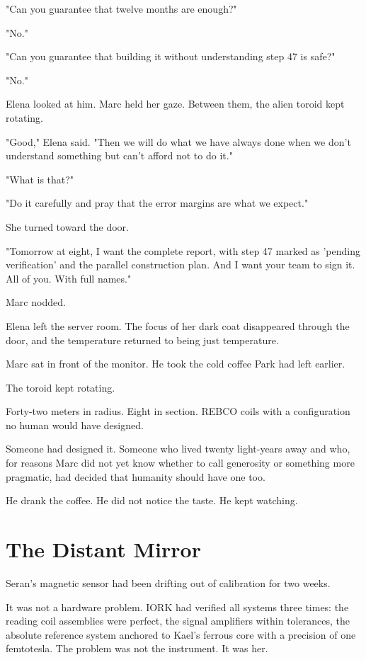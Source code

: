 \documentclass[11pt,a5paper,twoside]{book}
\begin{document}
"Can you guarantee that twelve months are enough?"

"No."

"Can you guarantee that building it without understanding step 47 is safe?"

"No."

Elena looked at him. Marc held her gaze. Between them, the alien toroid kept rotating.

"Good," Elena said. "Then we will do what we have always done when we don't understand something but can't afford not to do it."

"What is that?"

"Do it carefully and pray that the error margins are what we expect."

She turned toward the door.

"Tomorrow at eight, I want the complete report, with step 47 marked as 'pending verification' and the parallel construction plan. And I want your team to sign it. All of you. With full names."

Marc nodded.

Elena left the server room. The focus of her dark coat disappeared through the door, and the temperature returned to being just temperature.

Marc sat in front of the monitor. He took the cold coffee Park had left earlier.

The toroid kept rotating.

Forty-two meters in radius. Eight in section. REBCO coils with a configuration no human would have designed.

Someone had designed it. Someone who lived twenty light-years away and who, for reasons Marc did not yet know whether to call generosity or something more pragmatic, had decided that humanity should have one too.

He drank the coffee. He did not notice the taste. He kept watching.

\chapter{The Distant Mirror}

Seran's magnetic sensor had been drifting out of calibration for two weeks.

It was not a hardware problem. IORK had verified all systems three times: the reading coil assemblies were perfect, the signal amplifiers within tolerances, the absolute reference system anchored to Kael's ferrous core with a precision of one femtotesla. The problem was not the instrument. It was her.
\end{document}
